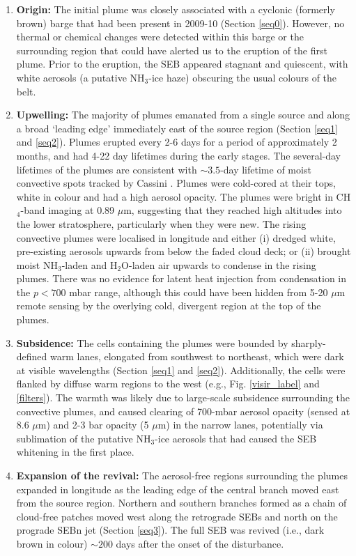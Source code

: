 \documentclass[final,authoryear,5p,times,twocolumn]{elsarticle}
\begin{document}
\begin{enumerate}
\item \textbf{Origin: } The initial plume was closely associated with a cyclonic (formerly brown) barge that had been present in 2009-10 (Section \ref{seq0}).  However, no thermal or chemical changes were detected within this barge or the surrounding region that could have alerted us to the eruption of the first plume.  Prior to the eruption, the SEB appeared stagnant and quiescent, with white aerosols (a putative NH$_3$-ice haze) obscuring the usual colours of the belt.
\item \textbf{Upwelling: } The majority of plumes emanated from a single source and along a broad `leading edge' immediately east of the source region (Section \ref{seq1} and \ref{seq2}).  Plumes erupted every 2-6 days for a period of approximately 2 months, and had 4-22 day lifetimes during the early stages.  The several-day lifetimes of the plumes are consistent with $\sim3.5$-day lifetime of moist convective spots tracked by Cassini \citep{04li}. Plumes were cold-cored at their tops, white in colour and had a high aerosol opacity.  The plumes were bright in CH$_4$-band imaging at 0.89 $\mu$m, suggesting that they reached high altitudes into the lower stratosphere, particularly when they were new.  The rising convective plumes were localised in longitude and either (i) dredged white, pre-existing aerosols upwards from below the faded cloud deck; or (ii) brought moist NH$_3$-laden and H$_2$O-laden air upwards to condense in the rising plumes.  There was no evidence for latent heat injection from condensation in the $p<700$ mbar range, although this could have been hidden from 5-20 $\mu$m remote sensing by the overlying cold, divergent region at the top of the plumes.  
\item \textbf{Subsidence: } The cells containing the plumes were bounded by sharply-defined warm lanes, elongated from southwest to northeast, which were dark at visible wavelengths (Section \ref{seq1} and \ref{seq2}).  Additionally, the cells were flanked by diffuse warm regions to the west (e.g., Fig. \ref{visir_label} and \ref{filters}).  The warmth was likely due to large-scale subsidence surrounding the convective plumes, and caused clearing of 700-mbar aerosol opacity (sensed at 8.6 $\mu$m) and 2-3 bar opacity (5 $\mu$m) in the narrow lanes, potentially via sublimation of the putative NH$_3$-ice aerosols that had caused the SEB whitening in the first place.  
\item \textbf{Expansion of the revival: } The aerosol-free regions surrounding the plumes expanded in longitude as the leading edge of the central branch moved east from the source region.  Northern and southern branches formed as a chain of cloud-free patches moved west along the retrograde SEBs and north on the prograde SEBn jet (Section \ref{seq3}).  The full SEB was revived (i.e., dark brown in colour) $\sim200$ days after the onset of the disturbance.

\end{enumerate}
\end{document}
